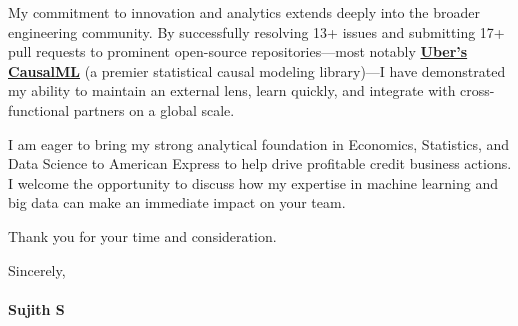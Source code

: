 \documentclass[a4paper,11pt]{article}
\newcommand{\ulink}[2]{\href{#1}{#2}}
\begin{document}
My commitment to innovation and analytics extends deeply into the broader engineering community. By successfully resolving 13+ issues and submitting 17+ pull requests to prominent open-source repositories---most notably \ulink{https://github.com/uber/causalml}{\textbf{Uber's CausalML}} (a premier statistical causal modeling library)---I have demonstrated my ability to maintain an external lens, learn quickly, and integrate with cross-functional partners on a global scale. 

I am eager to bring my strong analytical foundation in Economics, Statistics, and Data Science to American Express to help drive profitable credit business actions. I welcome the opportunity to discuss how my expertise in machine learning and big data can make an immediate impact on your team.

Thank you for your time and consideration.

Sincerely, \\
\vspace{5pt} \\
\textbf{Sujith S}
\end{document}
